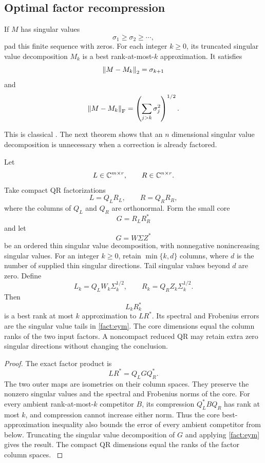 \subsection{Optimal factor recompression}\label{main:subsection:004}

\begin{standardfact}\label{main:standardfact:001}\label{fact:eym}
If \(M\) has singular values
\[
\sigma_1\geq\sigma_2\geq\cdots,
\]
pad this finite sequence with zeros. For each integer $k\ge0$, its truncated singular value decomposition $M_k$ is a best rank-at-most-$k$ approximation. It satisfies
\[
\left\lVert M-M_k\right\rVert_2=\sigma_{k+1}
\]
and
\[
\left\lVert M-M_k\right\rVert_{\rm F}
=
\left(
\sum_{j>k}\sigma_j^2
\right)^{1/2}.
\]
\end{standardfact}

This is classical \cite{EckartYoung1936,Mirsky1960}. The next theorem shows that an \(n\) dimensional singular value decomposition is unnecessary when a correction is already factored.

\begin{theorem}\label{main:theorem:011}\label{thm:small_core_recompression}
Let
\[
L\in\CC^{m\times r},
\qquad
R\in\CC^{n\times r}.
\]
Take compact QR factorizations
\[
L=Q_LR_L,
\qquad
R=Q_RR_R,
\]
where the columns of \(Q_L\) and \(Q_R\) are orthonormal. Form the small core
\[
G=R_LR_R^*
\]
and let
\[
G=W\Sigma Z^*
\]
be an ordered thin singular value decomposition, with nonnegative nonincreasing singular values. For an integer $k\ge0$, retain $\min\{k,d\}$ columns, where $d$ is the number of supplied thin singular directions. Tail singular values beyond $d$ are zero. Define
\[
L_k=Q_LW_k\Sigma_k^{1/2},
\qquad
R_k=Q_RZ_k\Sigma_k^{1/2}.
\]
Then
\[
L_kR_k^*
\]
is a best rank at most \(k\) approximation to \(LR^*\). Its spectral and Frobenius errors are the singular value tails in \cref{fact:eym}. The core dimensions equal the column ranks of the two input factors. A noncompact reduced QR may retain extra zero singular directions without changing the conclusion.
\end{theorem}

\begin{proof}\label{main:proof:023}
The exact factor product is
\[
LR^*
=
Q_LGQ_R^*.
\]
The two outer maps are isometries on their column spaces. They preserve the nonzero singular values and the spectral and Frobenius norms of the core. For every ambient rank-at-most-$k$ competitor $B$, its compression $Q_L^*BQ_R$ has rank at most $k$, and compression cannot increase either norm. Thus the core best-approximation inequality also bounds the error of every ambient competitor from below. Truncating the singular value decomposition of \(G\) and applying \cref{fact:eym} gives the result. The compact QR dimensions equal the ranks of the factor column spaces.
\label{main:proof:023:end}\end{proof}

